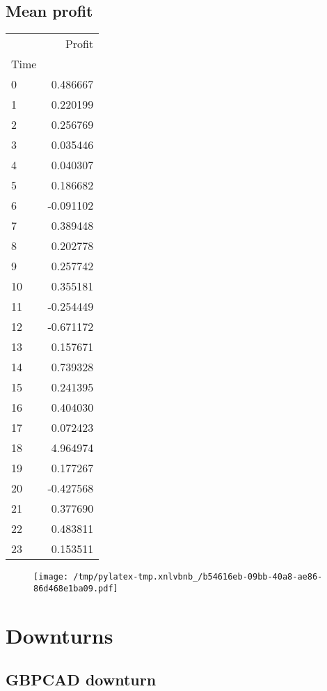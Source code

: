 \documentclass{article}%
\begin{document}
\subsection{Mean profit }%
\label{subsec:Meanprofit}%
\begin{tabular}{lr}
\toprule
{} &    Profit \\
Time &           \\
\midrule
0    &  0.486667 \\
1    &  0.220199 \\
2    &  0.256769 \\
3    &  0.035446 \\
4    &  0.040307 \\
5    &  0.186682 \\
6    & -0.091102 \\
7    &  0.389448 \\
8    &  0.202778 \\
9    &  0.257742 \\
10   &  0.355181 \\
11   & -0.254449 \\
12   & -0.671172 \\
13   &  0.157671 \\
14   &  0.739328 \\
15   &  0.241395 \\
16   &  0.404030 \\
17   &  0.072423 \\
18   &  4.964974 \\
19   &  0.177267 \\
20   & -0.427568 \\
21   &  0.377690 \\
22   &  0.483811 \\
23   &  0.153511 \\
\bottomrule
\end{tabular}
%


\begin{figure}[htbp]%
\centering%
\texttt{[image: /tmp/pylatex-tmp.xnlvbnb\_/b54616eb-09bb-40a8-ae86-86d468e1ba09.pdf]}%
\end{figure}

%
\newpage %
\section{Downturns}%
\label{sec:Downturns}%
\subsection{GBPCAD downturn}%
\label{subsec:GBPCADdownturn}%
\end{document}
